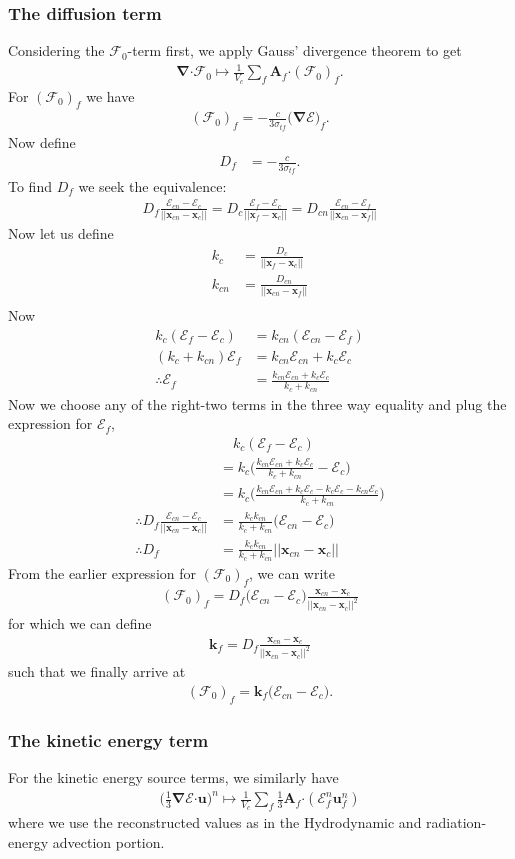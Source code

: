 \documentclass[10pt,letterpaper,notitlepage]{article}
\numberwithin{equation}{section}
\newcommand{\bnabla}{\boldsymbol{\nabla}}
\newcommand{\position}{\mathbf{x}}
\newcommand{\velocity}{\mathbf{u}}
\newcommand{\dotp}{\boldsymbol{\cdot}}
\newcommand{\RadE}{\mathcal{E}}
\newcommand{\RadF}{\boldsymbol{\mathcal{F}}}
\newcommand{\RadJ}{\RadF_0}
\newcommand{\AreaVec}{\mathbf{A}}
\newcommand{\beqn}{\begin{equation}\begin{aligned}}
\newcommand{\eeqn}{\end{aligned}\end{equation}}
\begin{document}
\subsubsection{The diffusion term}
Considering the $\RadJ$-term first, we apply Gauss' divergence theorem to get
\beqn 
\bnabla \dotp \RadJ \mapsto \frac{1}{V_c} \sum_f \AreaVec_f \dotp (\RadJ)_f.
\eeqn 
For $(\RadJ)_f$ we have
\beqn 
(\RadJ)_f = - \frac{c}{3\sigma_{tf}} \bigr(\bnabla \RadE \bigr)_f.
\eeqn 
Now define
\beqn
D_f &= - \frac{c}{3\sigma_{tf}}.
\eeqn 
To find $D_f$ we seek the equivalence:
\beqn
D_f \frac{\RadE_{cn} - \RadE_c}{|| \position_{cn} - \position_{c} ||} 
=
D_c \frac{\RadE_{f} - \RadE_c}{|| \position_{f} - \position_{c} ||} 
=
D_{cn} \frac{\RadE_{cn} - \RadE_f}{|| \position_{cn} - \position_{f} ||} 
\eeqn
Now let us define
\beqn 
k_c &= \frac{D_c}{|| \position_{f} - \position_{c} ||} \\
k_{cn} &= \frac{D_{cn}}{|| \position_{cn} - \position_{f} ||} \\
\eeqn 
Now
\beqn
k_c (\RadE_f - \RadE_c) &= k_{cn} (\RadE_{cn} - \RadE_f) \\
 (k_c +k_{cn}) \RadE_f &= k_{cn} \RadE_{cn} + k_c \RadE_{c} \\
 \therefore
 \RadE_f &= \frac{k_{cn} \RadE_{cn} + k_c \RadE_{c}}{k_c + k_{cn}}
\eeqn
Now we choose any of the right-two terms in the three way equality and plug the expression for $\RadE_f$,
\beqn 
&\quad k_c (\RadE_f - \RadE_c) \\
&= k_c \biggr(
\frac{k_{cn} \RadE_{cn} + k_c \RadE_{c}}{k_c + k_{cn}} - \RadE_c
\biggr) \\
&= k_c \biggr(
\frac{k_{cn} \RadE_{cn} + k_c \RadE_{c} - k_c\RadE_c -k_{cn} \RadE_c}{k_c + k_{cn}}
\biggr) \\
\therefore 
D_f \frac{\RadE_{cn} - \RadE_c}{|| \position_{cn} - \position_{c} ||} 
&= \frac{k_c k_{cn}}{k_c + k_{cn}} \bigr(\RadE_{cn} - \RadE_c \bigr)\\
\therefore
D_f &= \frac{k_c k_{cn}}{k_c + k_{cn}}  || \position_{cn} - \position_{c} ||
\eeqn 
From the earlier expression for $(\RadF_0)_f$, we can write
\beqn 
(\RadJ)_f = D_f \bigr( \RadE_{cn} - \RadE_c \bigr) \frac{\position_{cn} - \position_{c}}{|| \position_{cn} - \position_{c}||^2}
\eeqn 
for which we can define
\beqn 
\mathbf{k}_f = D_f  \frac{\position_{cn} - \position_{c}}{|| \position_{cn} - \position_{c}||^2}
\eeqn 
such that we finally arrive at
\beqn 
(\RadJ)_f = \mathbf{k}_f \bigr( \RadE_{cn} - \RadE_c \bigr).
\eeqn 


\subsubsection{The kinetic energy term}
For the kinetic energy source terms, we similarly have
\beqn 
\biggr( \frac{1}{3} \bnabla \RadE \dotp \velocity \biggr)^n
\mapsto 
\frac{1}{V_c} \sum_f \frac{1}{3} \AreaVec_f \dotp (\RadE_f^n \velocity_f^n)
\eeqn 
where we use the reconstructed values as in the Hydrodynamic and radiation-energy advection portion.
\end{document}
